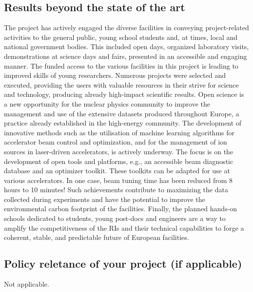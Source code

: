 \subsection*{Results beyond the state of the art}

The project has actively engaged the diverse facilities in conveying project-related activities to the general public, young school students and, at times, local and national government bodies. This included open days, organized laboratory visits, demonstrations at science days and fairs, presented in an accessible and engaging manner. The funded access to the various facilities in this project is leading to improved skills of young researchers. Numerous projects were selected and executed, providing the users with valuable resources in their strive for science and technology, producing already high-impact scientific results. Open science is a new opportunity for the nuclear physics community to improve the management and use of the extensive datasets produced throughout Europe, a practice already established in the high-energy community. The development of innovative methods such as the utilisation of machine learning algorithms for accelerator beam control and optimization, and for the management of ion sources in laser-driven accelerators, is actively underway.  The focus is on the development of open tools and platforms, e.g., an accessible beam diagnostic database and an optimizer toolkit.  These toolkits can be adapted for use at various accelerators.  In one case, beam tuning time has been reduced from 8 hours to 10 minutes! Such achievements contribute to maximizing the data collected during experiments and have the potential to improve the environmental carbon footprint of the facilities. Finally, the planned hands-on schools dedicated to students, young post-docs and engineers are a way to amplify the competitiveness of the RIs and their technical capabilities to forge a coherent, stable, and predictable future of European facilities.

\subsection*{Policy reletance of your project (if applicable)}

Not applicable.